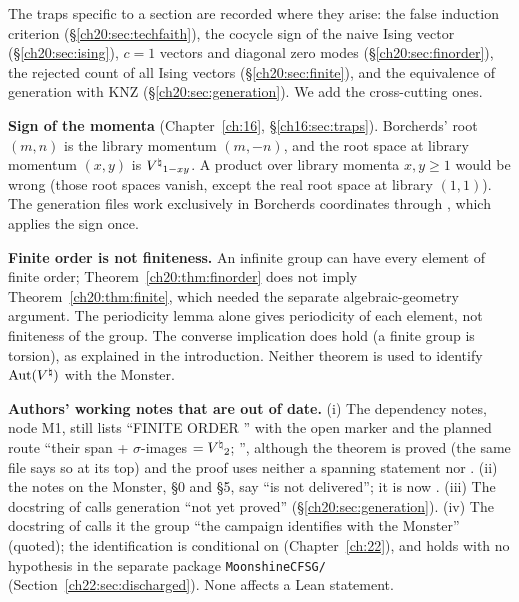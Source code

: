 The traps specific to a section are recorded where they arise: the false induction criterion
(\S\ref{ch20:sec:techfaith}), the cocycle sign of the naive Ising vector (\S\ref{ch20:sec:ising}), $c=1$ vectors and diagonal
zero modes (\S\ref{ch20:sec:finorder}), the rejected count of all Ising vectors (\S\ref{ch20:sec:finite}), and the equivalence of
generation with KNZ (\S\ref{ch20:sec:generation}).  We add the cross-cutting ones.

\begin{warning}
\textbf{Sign of the momenta} (Chapter~\ref{ch:16}, \S\ref{ch16:sec:traps}).  Borcherds' root $(m,n)$ is the library momentum
$(m,-n)$, and the root space at library momentum $(x,y)$ is ${V^{\natural}}_{1-xy}$.  A product over library momenta $x,y\ge1$ would be
wrong (those root spaces vanish, except the real root space at library $(1,1)$).  The generation files work exclusively in Borcherds coordinates through
, which applies the sign once.
\end{warning}

\begin{warning}
\textbf{Finite order is not finiteness.}  An infinite group can have every element of finite
order; Theorem~\ref{ch20:thm:finorder} does not imply Theorem~\ref{ch20:thm:finite}, which needed the separate algebraic-geometry
argument.  The periodicity lemma alone gives periodicity of each element, not finiteness of the group.  The converse
implication does hold (a finite group is torsion), as explained in the introduction.  Neither theorem is used to identify
$\operatorname{Aut}({V^{\natural}})$ with the Monster.
\end{warning}

\begin{warning}
\textbf{Authors' working notes that are out of date.}  (i) The dependency notes,
node M1, still lists ``FINITE ORDER '' with the open marker and the planned route ``their span +
$\sigma$-images $={V^{\natural}}_2$; '', although the theorem is proved (the same file says so at its
top) and the proof uses neither a spanning statement nor .  (ii)
the notes on the Monster, \S0 and \S5, say  ``is not delivered''; it is now
.  (iii) The docstring of  calls generation ``not yet proved''
(\S\ref{ch20:sec:generation}).  (iv) The docstring of  calls it the group ``the campaign identifies with the
Monster'' (quoted); the identification is conditional on  (Chapter~\ref{ch:22}), and holds with no
hypothesis in the separate package \texttt{MoonshineCFSG/} (Section~\ref{ch22:sec:discharged}).  None affects a Lean statement.
\end{warning}

